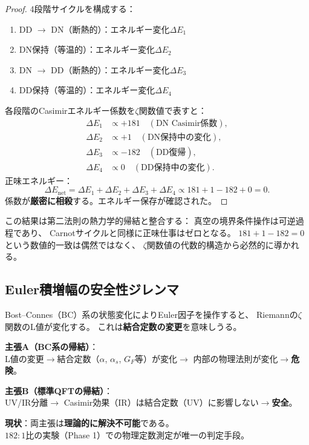 \begin{proof}
4段階サイクルを構成する：
\begin{enumerate}
\item DD $\to$ DN（断熱的）：エネルギー変化$\Delta E_1$
\item DN保持（等温的）：エネルギー変化$\Delta E_2$
\item DN $\to$ DD（断熱的）：エネルギー変化$\Delta E_3$
\item DD保持（等温的）：エネルギー変化$\Delta E_4$
\end{enumerate}
各段階のCasimirエネルギー係数を$\zeta$関数値で表すと：
\begin{align}
\Delta E_1 &\propto +181 \quad (\text{DN Casimir係数}), \\
\Delta E_2 &\propto +1 \quad (\text{DN保持中の変化}), \\
\Delta E_3 &\propto -182 \quad (\text{DD復帰}), \\
\Delta E_4 &\propto 0 \quad (\text{DD保持中の変化}).
\end{align}
正味エネルギー：
\[
\Delta E_{\text{net}} = \Delta E_1 + \Delta E_2 + \Delta E_3 + \Delta E_4
\propto 181 + 1 - 182 + 0 = 0.
\]
係数が\textbf{厳密に相殺}する。エネルギー保存が確認された。\qedhere
\end{proof}

\begin{remark}
この結果は第二法則の熱力学的帰結と整合する：
真空の境界条件操作は可逆過程であり、
Carnotサイクルと同様に正味仕事はゼロとなる。
$181 + 1 - 182 = 0$という数値的一致は偶然ではなく、
$\zeta$関数値の代数的構造から必然的に導かれる。
\end{remark}


\subsection{Euler積増幅の安全性ジレンマ}
\label{sec:14.3}

Bost--Connes（BC）系の状態変化によりEuler因子を操作すると、
Riemannの$\zeta$関数のL値が変化する。
これは\textbf{結合定数の変更}を意味しうる。

\begin{tcolorbox}[colback=yellow!5!white, colframe=yellow!70!black, title=安全性ジレンマ：未解決問題]
\textbf{主張A（BC系の帰結）}：\\
L値の変更$\to$結合定数（$\alpha$, $\alpha_s$, $G_F$等）が変化$\to$
内部の物理法則が変化$\to$\textbf{危険}。

\vspace{0.5em}
\textbf{主張B（標準QFTの帰結）}：\\
UV/IR分離$\to$ Casimir効果（IR）は結合定数（UV）に影響しない$\to$\textbf{安全}。

\vspace{0.5em}
\textbf{現状}：両主張は\textbf{理論的に解決不可能}である。\\
$182:1$比の実験（Phase 1）での物理定数測定が唯一の判定手段。
\end{tcolorbox}

